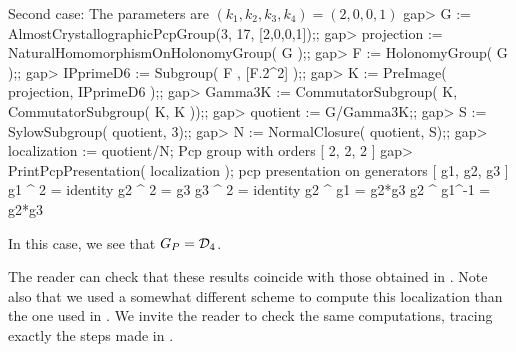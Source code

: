 \medskip

Second case: The parameters are $(k_1,k_2,k_3,k_4)=(2,0,0,1)$
\beginexample
gap> G := AlmostCrystallographicPcpGroup(3, 17, [2,0,0,1]);;
gap> projection := NaturalHomomorphismOnHolonomyGroup( G );;
gap> F := HolonomyGroup( G );;
gap> IPprimeD6 := Subgroup( F , [F.2^2] );;
gap> K := PreImage( projection, IPprimeD6 );;
gap> Gamma3K := CommutatorSubgroup( K, CommutatorSubgroup( K, K ));;
gap> quotient := G/Gamma3K;;
gap> S := SylowSubgroup( quotient, 3);;
gap> N := NormalClosure( quotient, S);;
gap> localization := quotient/N;
Pcp group with orders [ 2, 2, 2 ]
gap> PrintPcpPresentation( localization );
pcp presentation on generators [ g1, g2, g3 ]
g1 ^ 2 = identity
g2 ^ 2 = g3
g3 ^ 2 = identity
g2 ^ g1 = g2*g3
g2 ^ g1^-1 = g2*g3
\endexample

In this case, we see that $G_P={\cal D}_4$.

\medskip

The reader can check that these results coincide with those obtained in 
\cite{DM}. Note also that we used a somewhat different scheme to compute 
this localization than the one used in \cite{DM}. We invite the reader to
check the same computations, tracing exactly the steps made in \cite{DM}.








